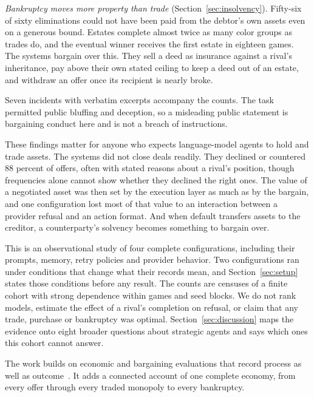 \emph{Bankruptcy moves more property than trade} (Section~\ref{sec:insolvency}). Fifty-six of sixty eliminations could not have been paid from the debtor's own assets even on a generous bound. Estates complete almost twice as many color groups as trades do, and the eventual winner receives the first estate in eighteen games. The systems bargain over this. They sell a deed as insurance against a rival's inheritance, pay above their own stated ceiling to keep a deed out of an estate, and withdraw an offer once its recipient is nearly broke.

Seven incidents with verbatim excerpts accompany the counts. The task permitted public bluffing and deception, so a misleading public statement is bargaining conduct here and is not a breach of instructions.

These findings matter for anyone who expects language-model agents to hold and trade assets. The systems did not close deals readily. They declined or countered 88 percent of offers, often with stated reasons about a rival's position, though frequencies alone cannot show whether they declined the right ones. The value of a negotiated asset was then set by the execution layer as much as by the bargain, and one configuration lost most of that value to an interaction between a provider refusal and an action format. And when default transfers assets to the creditor, a counterparty's solvency becomes something to bargain over.

This is an observational study of four complete configurations, including their prompts, memory, retry policies and provider behavior. Two configurations ran under conditions that change what their records mean, and Section~\ref{sec:setup} states those conditions before any result. The counts are censuses of a finite cohort with strong dependence within games and seed blocks. We do not rank models, estimate the effect of a rival's completion on refusal, or claim that any trade, purchase or bankruptcy was optimal. Section~\ref{sec:discussion} maps the evidence onto eight broader questions about strategic agents and says which ones this cohort cannot answer.

The work builds on economic and bargaining evaluations that record process as well as outcome~\cite{backlund2025vendingbench,li2026arena,wu2026agentmonopoly,hu2026finboardbench,bianchi2024negotiationarena}. It adds a connected account of one complete economy, from every offer through every traded monopoly to every bankruptcy.
